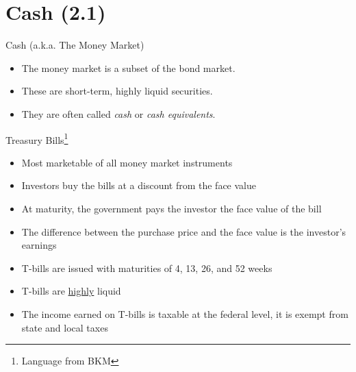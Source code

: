 \documentclass{beamer}
\begin{document}

\section{Cash (2.1)}

\begin{frame}{Cash (a.k.a. The Money Market)}
	\begin{itemize}
		\item The money market is a subset of the bond market.
		\item These are short-term, highly liquid securities.
		\item They are often called \textit{cash} or \textit{cash equivalents}.
	\end{itemize}
\end{frame}

\begin{frame}{Treasury Bills\footnote{Language from BKM}}
	\begin{itemize}
		\item Most marketable of all money market instruments
		\item Investors buy the bills at a discount from the face value
		\item At maturity, the government pays the investor the face value of the bill
		\item The difference between the purchase price and the face value is the investor's earnings
		\item T-bills are issued with maturities of 4, 13, 26, and 52 weeks
		\item T-bills are \underline{highly} liquid
		\item The income earned on T-bills is taxable at the federal level, it is exempt from state and local taxes
	\end{itemize}
\end{frame}
\end{document}
